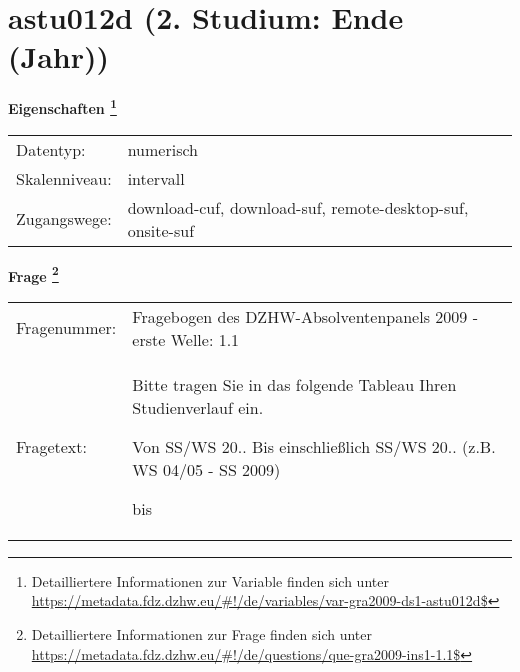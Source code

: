 
    \setcounter{footnote}{0}

    \vspace*{-1.8cm}
	\section{astu012d (2. Studium: Ende (Jahr))}
	\label{section:astu012d}



    \vspace*{0.5cm}
    \noindent\textbf{Eigenschaften
	\footnote{Detailliertere Informationen zur Variable finden sich unter
		\url{https://metadata.fdz.dzhw.eu/\#!/de/variables/var-gra2009-ds1-astu012d$}}}\\
	\begin{tabularx}{\hsize}{@{}lX}
	Datentyp: & numerisch \\
	Skalenniveau: & intervall \\
	Zugangswege: &
	  download-cuf, 
	  download-suf, 
	  remote-desktop-suf, 
	  onsite-suf
 \\
    \end{tabularx}



				\vspace*{0.5cm}
                \noindent\textbf{Frage
	                \footnote{Detailliertere Informationen zur Frage finden sich unter
		              \url{https://metadata.fdz.dzhw.eu/\#!/de/questions/que-gra2009-ins1-1.1$}}}\\
				\begin{tabularx}{\hsize}{@{}lX}
					Fragenummer: &
					  Fragebogen des DZHW-Absolventenpanels 2009 - erste Welle:
					  1.1
 \\
					Fragetext: & Bitte tragen Sie in das folgende Tableau Ihren Studienverlauf ein.\par  Von SS/WS 20.. Bis einschließlich SS/WS 20.. (z.B. WS 04/05 - SS 2009)\par  bis \\
				\end{tabularx}





